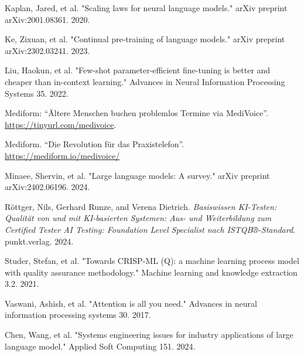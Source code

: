 \documentclass[twocolumn]{article}
\begin{document}
\begin{thebibliography}{99}
 Kaplan, Jared, et al. "Scaling laws for neural language models." arXiv preprint arXiv:2001.08361. 2020.

 Ke, Zixuan, et al. "Continual pre-training of language models." arXiv preprint arXiv:2302.03241. 2023.

 Liu, Haokun, et al. "Few-shot parameter-efficient fine-tuning is better and cheaper than in-context learning." Advances in Neural Information Processing Systems 35. 2022.

 Mediform: “Ältere Menschen buchen problemlos Termine via MediVoice”. \url{https://tinyurl.com/medivoice}.

 Mediform. “Die Revolution für das Praxistelefon”. \url{https://mediform.io/medivoice/}

 Minaee, Shervin, et al. "Large language models: A survey." arXiv preprint arXiv:2402.06196. 2024.

 Röttger, Nils, Gerhard Runze, and Verena Dietrich. \emph{Basiswissen KI-Testen: Qualität von und mit KI-basierten Systemen: Aus- und Weiterbildung zum Certified Tester AI Testing: Foundation Level Specialist nach ISTQB®-Standard}. punkt.verlag. 2024.

 Studer, Stefan, et al. "Towards CRISP-ML (Q): a machine learning process model with quality assurance methodology." Machine learning and knowledge extraction 3.2. 2021.

 Vaswani, Ashish, et al. "Attention is all you need." Advances in neural information processing systems 30. 2017.

 Chen, Wang, et al. "Systems engineering issues for industry applications of large language model." Applied Soft Computing 151. 2024.

\end{thebibliography}
\end{document}
